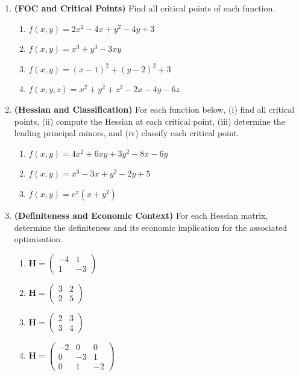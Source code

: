 \documentclass[12pt, a4paper]{article}
\theoremstyle{definition}
\newcommand{\bH}{\mathbf{H}}
\begin{document}
\begin{enumerate}[label=\textbf{A\arabic*.}, leftmargin=2.5em]

\item \textbf{(FOC and Critical Points)}
Find all critical points of each function.
\begin{enumerate}[label=(\alph*)]
  \item $f(x,y) = 2x^2 - 4x + y^2 - 4y + 3$
  \item $f(x,y) = x^3 + y^3 - 3xy$
  \item $f(x,y) = (x-1)^2 + (y-2)^2 + 3$
  \item $f(x,y,z) = x^2 + y^2 + z^2 - 2x - 4y - 6z$
\end{enumerate}

\item \textbf{(Hessian and Classification)}
For each function below, (i) find all critical points, (ii) compute the
Hessian at each critical point, (iii) determine the leading principal
minors, and (iv) classify each critical point.
\begin{enumerate}[label=(\alph*)]
  \item $f(x,y) = 4x^2 + 6xy + 3y^2 - 8x - 6y$
  \item $f(x,y) = x^3 - 3x + y^2 - 2y + 5$
  \item $f(x,y) = e^x(x+y^2)$
\end{enumerate}

\item \textbf{(Definiteness and Economic Context)}
For each Hessian matrix, determine the definiteness and its economic
implication for the associated optimisation.
\begin{enumerate}[label=(\alph*)]
  \item $\bH = \begin{pmatrix}-4 & 1 \\ 1 & -3\end{pmatrix}$
  \item $\bH = \begin{pmatrix}3 & 2 \\ 2 & 5\end{pmatrix}$
  \item $\bH = \begin{pmatrix}2 & 3 \\ 3 & 4\end{pmatrix}$
  \item $\bH = \begin{pmatrix}-2 & 0 & 0 \\ 0 & -3 & 1 \\ 0 & 1 & -2\end{pmatrix}$
\end{enumerate}


\end{enumerate}
\end{document}
